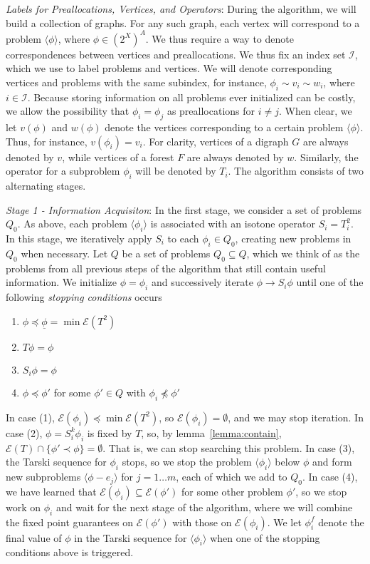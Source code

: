 \documentclass[11pt,reqno]{amsart}
\theoremstyle{definition}
\numberwithin{equation}{section}
\newcommand{\ul}{\underline}
\newcommand{\lag}{\langle}
\newcommand{\rag}{\rangle}
\newcommand{\pre}{\phi}
\newcommand{\prealloc}{(2^X)^A}
\newcommand{\sub}{\subseteq}
\newcommand{\fix}{\mathcal{E}}
\newcommand{\peq}{\preceq}
\newcommand{\pe}{\prec}
\newcommand{\acto}{Q_0}
\newcommand{\act}{Q}
\newcommand{\pref}{\pre^{f}}
\begin{document}
\emph{Labels for Preallocations, Vertices, and Operators}:
During the algorithm, we will build a collection of graphs.
For any such graph, each vertex will correspond to a problem $\lag \pre \rag$, where $\pre \in \prealloc$.
We thus require a way to denote correspondences between vertices and preallocations. 
We thus fix an index set $\mathcal{I}$, which we use to label problems and vertices.
We will denote corresponding vertices and problems with the same subindex, for instance, $\pre_i \sim v_i \sim w_i$, where $i \in \mathcal{I}$. 
Because storing information on all problems ever initialized can be costly, we allow the possibility that $\pre_i = \pre_j$ as preallocations for $i \not = j$.
When clear, we let $v(\pre)$ and $w(\pre)$ denote the vertices corresponding to a certain problem $\lag \pre \rag$.
Thus, for instance, $v(\pre_i) = v_i$.
For clarity, vertices of a digraph $G$ are always denoted by $v$, while vertices of a forest $F$ are always denoted by $w$.
Similarly, the operator for a subproblem $\pre_i$ will be denoted by $T_i$.
The algorithm consists of two alternating stages. 

\emph{Stage 1 - Information Acquisiton}: In the first stage, we consider a set of problems $\acto$.
As above, each problem $\lag \pre_i \rag$ is associated with an isotone operator $S_i = T_i^2$.
In this stage, we iteratively apply $S_i$ to each $\pre_i \in \acto$, creating new problems in $\acto$ when necessary.
Let $\act$ be a set of problems $\acto \sub \act$, which we think of as the problems from all previous steps of the algorithm that still contain useful information.  
We initialize $\pre = \pre_i$ and successively iterate $\pre \to S_i \pre$ until one of the following \emph{stopping conditions} occurs
\begin{enumerate}
\item $\pre \peq \ul{\pre} = \min \fix(T^2)$ 
\item $T \pre = \pre$
\item $S_i \pre = \pre$
\item $\pre \peq \pre'$ for some $\pre' \in Q$ with $\pre_i \not \peq \pre'$ 
\end{enumerate} 

In case (1), $\fix(\pre_i) \peq \min \fix(T^2)$, so $\fix(\pre_i) = \emptyset$, and we may stop iteration. 
In case (2), $\pre = S_i^k \pre_i$ is fixed by $T$, so, by lemma~\ref{lemma:contain}, $\fix(T) \cap \{\pre' \pe \pre \} = \emptyset$.
That is, we can stop searching this problem.
In case (3), the Tarski sequence for $\pre_i$ stops, so we stop the problem $\lag \pre_i \rag$ below $\pre$ and form new subproblems $\lag \pre - e_j \rag$ for $j = 1 \hdots m$, each of which we add to $\acto$.  
In case (4), we have learned that $\fix(\pre_i) \sub \fix(\pre')$ for some other problem $\pre'$, so we stop work on $\pre_i$ and wait for the next stage of the algorithm, where we will combine the fixed point guarantees on $\fix(\pre')$ with those on $\fix(\pre_i)$.
We let $\pref_i$ denote the final value of $\pre$ in the Tarski sequence for $\lag \pre_i \rag$ when one of the stopping conditions above is triggered. 
\end{document}
